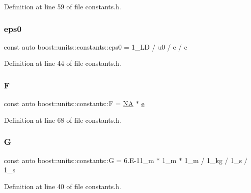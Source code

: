 Definition at line 59 of file constants.\+h.

\hypertarget{namespaceboost_1_1units_1_1constants_a7418381307037e971ba8770ccffdf204}{}\label{namespaceboost_1_1units_1_1constants_a7418381307037e971ba8770ccffdf204} 
\subsubsection{\texorpdfstring{eps0}{eps0}}
{\footnotesize\ttfamily const auto boost\+::units\+::constants\+::eps0 = 1\+\_\+\+L\+D / u0 / c / c}



Definition at line 44 of file constants.\+h.

\hypertarget{namespaceboost_1_1units_1_1constants_ad4a323c9b82ddc3904d2132c326ebaae}{}\label{namespaceboost_1_1units_1_1constants_ad4a323c9b82ddc3904d2132c326ebaae} 
\subsubsection{\texorpdfstring{F}{F}}
{\footnotesize\ttfamily const auto boost\+::units\+::constants\+::F = \hyperlink{namespaceboost_1_1units_1_1constants_a7f9d392dceaa7bbe31525aa275c6489d}{NA} $\ast$ \hyperlink{namespaceboost_1_1units_1_1constants_a0e10024b337b34c7f7300c67f0e9fcb1}{e}}



Definition at line 68 of file constants.\+h.

\hypertarget{namespaceboost_1_1units_1_1constants_abeab95597a02e0f0bccbd005fd8cb968}{}\label{namespaceboost_1_1units_1_1constants_abeab95597a02e0f0bccbd005fd8cb968} 
\subsubsection{\texorpdfstring{G}{G}}
{\footnotesize\ttfamily const auto boost\+::units\+::constants\+::G = 6.\+E-\/11\+\_\+m $\ast$ 1\+\_\+m $\ast$ 1\+\_\+m / 1\+\_\+kg / 1\+\_\+s / 1\+\_\+s}



Definition at line 40 of file constants.\+h.

